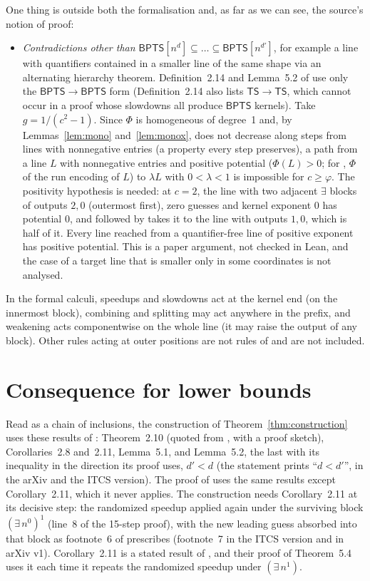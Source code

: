 \documentclass[11pt]{article}
\theoremstyle{definition}
\newcommand{\TS}{\mathsf{TS}}
\newcommand{\BPTS}{\mathsf{BPTS}}
\newcommand{\leanus}{\textunderscore\allowbreak}
\newcommand{\lean}[1]{\ifmmode\text{\ttfamily #1}\else{\ttfamily\let\_\leanus #1}\fi}
\begin{document}
One thing is outside both the formalisation and, as far as we can see, the source's notion of proof:
\begin{itemize}
\item \emph{Contradictions other than $\BPTS[n^d]\subseteq\dots\subseteq\BPTS[n^{d'}]$}, for example a line with quantifiers contained in a smaller line of the same shape via an alternating hierarchy theorem. Definition~2.14 and Lemma~5.2 of \cite{MW21} use only the $\BPTS\to\BPTS$ form (Definition~2.14 also lists $\TS\to\TS$, which cannot occur in a proof whose slowdowns all produce $\BPTS$ kernels). Take $g=1/(c^2-1)$. Since $\Phi$ is homogeneous of degree~1 and, by Lemmas~\ref{lem:mono} and~\ref{lem:monox}, does not decrease along steps from lines with nonnegative entries (a property every step preserves), a path from a line $L$ with nonnegative entries and positive potential ($\Phi(L)>0$; for \lean{MWL.StepX}, $\Phi$ of the run encoding of $L$) to $\lambda L$ with $0<\lambda<1$ is impossible for $c\ge\varphi$. The positivity hypothesis is needed: at $c=2$, the line with two adjacent $\exists$ blocks of outputs $2,0$ (outermost first), zero guesses and kernel exponent $0$ has potential $0$, and \lean{combine} followed by \lean{split} takes it to the line with outputs $1,0$, which is half of it. Every line reached from a quantifier-free line of positive exponent has positive potential. This is a paper argument, not checked in Lean, and the case of a target line that is smaller only in some coordinates is not analysed.
\end{itemize}
In the formal calculi, speedups and slowdowns act at the kernel end (on the innermost block), combining and splitting may act anywhere in the prefix, and weakening acts componentwise on the whole line (it may raise the output of any block). Other rules acting at outer positions are not rules of \cite{MW21} and are not included.

\section{Consequence for lower bounds}\label{sec:consequence}

Read as a chain of inclusions, the construction of Theorem~\ref{thm:construction} uses these results of \cite{MW21}: Theorem~2.10 (quoted from \cite{DvM06}, with a proof sketch), Corollaries~2.8 and~2.11, Lemma~5.1, and Lemma~5.2, the last with its inequality in the direction its proof uses, $d'<d$ (the statement prints ``$d<d'$'', in the arXiv and the ITCS version). The proof of \cite[Theorem~5.3]{MW21} uses the same results except Corollary~2.11, which it never applies. The construction needs Corollary~2.11 at its decisive step: the randomized speedup applied again under the surviving block $(\exists\,n^0)^1$ (line~8 of the 15-step proof), with the new leading guess absorbed into that block as footnote~6 of \cite{MW21} prescribes (footnote~7 in the ITCS version and in arXiv v1). Corollary~2.11 is a stated result of \cite{MW21}, and their proof of Theorem~5.4 uses it each time it repeats the randomized speedup under $(\exists\,n^1)$.
\end{document}
